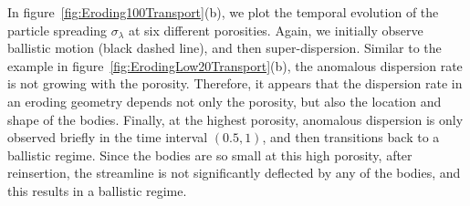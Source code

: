 \documentclass{jfm}
\begin{document}
In figure~\ref{fig:Eroding100Transport}(b), we plot the temporal
evolution of the particle spreading $\sigma_\lambda$ at six different
porosities. Again, we initially observe ballistic motion (black dashed
line), and then super-dispersion.  Similar to the example in
figure~\ref{fig:ErodingLow20Transport}(b), the anomalous dispersion rate
is not growing with the porosity.  Therefore, it appears that the
dispersion rate in an eroding geometry depends not only the porosity,
but also the location and shape of the bodies.  Finally, at the highest
porosity, anomalous dispersion is only observed briefly in the time
interval $(0.5,1)$, and then transitions back to a ballistic regime.
Since the bodies are so small at this high porosity, after reinsertion,
the streamline is not significantly deflected by any of the bodies, and
this results in a ballistic regime.
\end{document}
